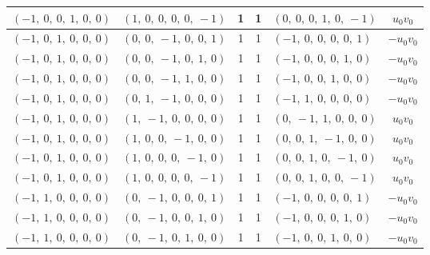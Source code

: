 \documentclass[11pt]{article}
\theoremstyle{definition}
\begin{document}
\begin{longtable}{|l|l|c|c|l|c|}
    \hline
    $\left( -1, \  0, \  0, \  1, \  0, \  0\right)$ & $\left( 1, \  0, \  0, \  0, \  0, \  -1\right)$ & 1 & 1 & $\left( 0, \  0, \  0, \  1, \  0, \  -1\right)$ & $u_{0} v_{0}$ \\
    \hline
    $\left( -1, \  0, \  1, \  0, \  0, \  0\right)$ & $\left( 0, \  0, \  -1, \  0, \  0, \  1\right)$ & 1 & 1 & $\left( -1, \  0, \  0, \  0, \  0, \  1\right)$ & $- u_{0} v_{0}$ \\
    \hline
    $\left( -1, \  0, \  1, \  0, \  0, \  0\right)$ & $\left( 0, \  0, \  -1, \  0, \  1, \  0\right)$ & 1 & 1 & $\left( -1, \  0, \  0, \  0, \  1, \  0\right)$ & $- u_{0} v_{0}$ \\
    \hline
    $\left( -1, \  0, \  1, \  0, \  0, \  0\right)$ & $\left( 0, \  0, \  -1, \  1, \  0, \  0\right)$ & 1 & 1 & $\left( -1, \  0, \  0, \  1, \  0, \  0\right)$ & $- u_{0} v_{0}$ \\
    \hline
    $\left( -1, \  0, \  1, \  0, \  0, \  0\right)$ & $\left( 0, \  1, \  -1, \  0, \  0, \  0\right)$ & 1 & 1 & $\left( -1, \  1, \  0, \  0, \  0, \  0\right)$ & $- u_{0} v_{0}$ \\
    \hline
    $\left( -1, \  0, \  1, \  0, \  0, \  0\right)$ & $\left( 1, \  -1, \  0, \  0, \  0, \  0\right)$ & 1 & 1 & $\left( 0, \  -1, \  1, \  0, \  0, \  0\right)$ & $u_{0} v_{0}$ \\
    \hline
    $\left( -1, \  0, \  1, \  0, \  0, \  0\right)$ & $\left( 1, \  0, \  0, \  -1, \  0, \  0\right)$ & 1 & 1 & $\left( 0, \  0, \  1, \  -1, \  0, \  0\right)$ & $u_{0} v_{0}$ \\
    \hline
    $\left( -1, \  0, \  1, \  0, \  0, \  0\right)$ & $\left( 1, \  0, \  0, \  0, \  -1, \  0\right)$ & 1 & 1 & $\left( 0, \  0, \  1, \  0, \  -1, \  0\right)$ & $u_{0} v_{0}$ \\
    \hline
    $\left( -1, \  0, \  1, \  0, \  0, \  0\right)$ & $\left( 1, \  0, \  0, \  0, \  0, \  -1\right)$ & 1 & 1 & $\left( 0, \  0, \  1, \  0, \  0, \  -1\right)$ & $u_{0} v_{0}$ \\
    \hline
    $\left( -1, \  1, \  0, \  0, \  0, \  0\right)$ & $\left( 0, \  -1, \  0, \  0, \  0, \  1\right)$ & 1 & 1 & $\left( -1, \  0, \  0, \  0, \  0, \  1\right)$ & $- u_{0} v_{0}$ \\
    \hline
    $\left( -1, \  1, \  0, \  0, \  0, \  0\right)$ & $\left( 0, \  -1, \  0, \  0, \  1, \  0\right)$ & 1 & 1 & $\left( -1, \  0, \  0, \  0, \  1, \  0\right)$ & $- u_{0} v_{0}$ \\
    \hline
    $\left( -1, \  1, \  0, \  0, \  0, \  0\right)$ & $\left( 0, \  -1, \  0, \  1, \  0, \  0\right)$ & 1 & 1 & $\left( -1, \  0, \  0, \  1, \  0, \  0\right)$ & $- u_{0} v_{0}$ \\

\end{longtable}
\end{document}
